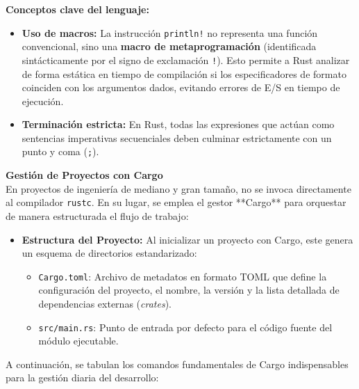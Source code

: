 \documentclass[11pt, a4paper]{article}
\begin{document}
\noindent\textbf{Conceptos clave del lenguaje:}
\begin{itemize}
  \item \textbf{Uso de macros:} La instrucción \texttt{println!} no representa una función convencional, sino una \textbf{macro de metaprogramación} (identificada sintácticamente por el signo de exclamación \texttt{!}). Esto permite a Rust analizar de forma estática en tiempo de compilación si los especificadores de formato coinciden con los argumentos dados, evitando errores de E/S en tiempo de ejecución.
  \item \textbf{Terminación estricta:} En Rust, todas las expresiones que actúan como sentencias imperativas secuenciales deben culminar estrictamente con un punto y coma (\texttt{;}).
\end{itemize}

\noindent\textbf{Gestión de Proyectos con Cargo}\\[0.5em]
En proyectos de ingeniería de mediano y gran tamaño, no se invoca directamente al compilador \texttt{rustc}. En su lugar, se emplea el gestor **Cargo** para orquestar de manera estructurada el flujo de trabajo:

\begin{itemize}
  \item \textbf{Estructura del Proyecto:} Al inicializar un proyecto con Cargo, este genera un esquema de directorios estandarizado:
    \begin{itemize}
      \item \texttt{Cargo.toml}: Archivo de metadatos en formato TOML que define la configuración del proyecto, el nombre, la versión y la lista detallada de dependencias externas (\textit{crates}).
      \item \texttt{src/main.rs}: Punto de entrada por defecto para el código fuente del módulo ejecutable.
    \end{itemize}
\end{itemize}

A continuación, se tabulan los comandos fundamentales de Cargo indispensables para la gestión diaria del desarrollo:
\end{document}
